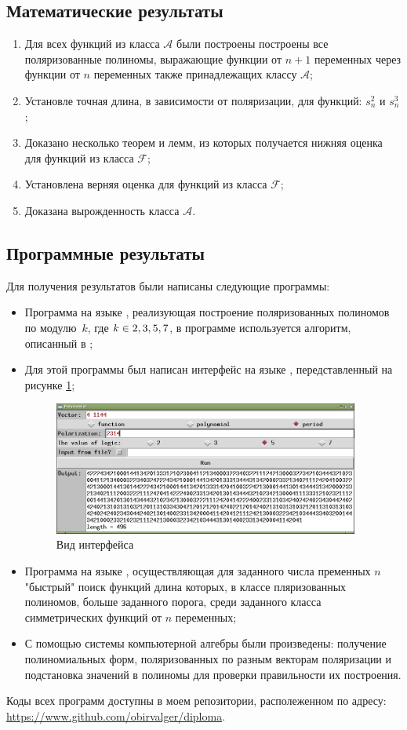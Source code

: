 \documentclass[bibliography=totoc, a4paper, 14pt]{extarticle}
\def\in{\mathchar"3232\nobreak\discretionary{}{\usefont{OMS}{cmsy}{m}{n}\char50}{}}
\begin{document}
\subsection{Математические результаты}
\begin{enumerate}
\item Для всех функций из класса $\mathcal{A}$ были построены построены все поляризованные
полиномы, выражающие функции от $n+1$ переменных через функции от $n$ переменных также принадлежащих
классу $\mathcal{A}$;
\item Установле точная длина, в зависимости от поляризации, для функций: $s^2_n$ и $s^3_n$;
\item Доказано несколько теорем и лемм, из которых получается нижняя оценка для функций из
класса $\mathcal{F}$;
\item Установлена верняя оценка для функций из класса $\mathcal{F}$;
\item Доказана вырожденность класса $\mathcal{A}$.
\end{enumerate}

\subsection{Программные результаты}
Для получения результатов были написаны следующие программы:
\begin{itemize}
\item Программа на языке {}, реализующая построение поляризованных полиномов по
    модулю~$k$, где $k \in {2,3,5,7}$, в программе используется алгоритм, описанный в \cite{sm09};
\item Для этой программы был написан интерфейс на языке {}, передставленный на
    рисунке \ref{ps};
    \begin{figure}[h]
    \centering
    \includegraphics[width=0.95\textwidth]{polyscreen.png}
    \caption{Вид интерфейса \label{ps}}
    \end{figure}
\item Программа на языке {}, осуществляющая для заданного числа пременных $n$
    "быстрый"{} поиск функций длина которых, в классе пляризованных полиномов, больше заданного
    порога, среди заданного класса симметрических функций от $n$ переменных;
\item С помощью системы компьютерной алгебры  \cite{sage} были произведены: получение
    полиномиальных форм, поляризованных по разным векторам поляризации и подстановка значений в
    полиномы для проверки правильности их построения.
\end{itemize}
Коды всех программ доступны в моем репозитории, располеженном по адресу:
\mbox{\url{https://www.github.com/obirvalger/diploma}}.
\end{document}
